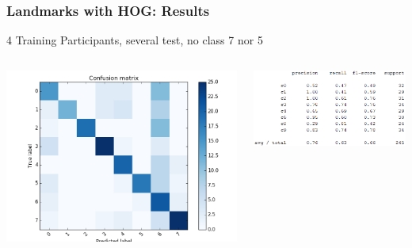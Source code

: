 \documentclass{beamer}
\begin{document}
	\begin{frame}
		\frametitle{Landmarks with HOG: Results}
		4 Training Participants, several test, no class 7 nor 5
		\begin{columns}
			\begin{column}{0.5\textwidth}
				\begin{center}
					\includegraphics[width=\textwidth]{mult_HOG/4c01234689matTest2}\\			
				\end{center}
			\end{column}
			\begin{column}{0.5\textwidth}
				\begin{center}
					\includegraphics[width=\textwidth]{mult_HOG/4c01234689repTest2}
				\end{center}
			\end{column}
		\end{columns}		
	\end{frame}	
	
\end{document}
